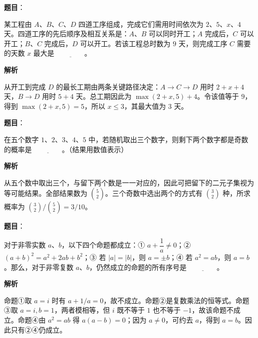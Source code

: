 \begin{answer}

\textbf{题目}：

某工程由 $A$、$B$、$C$、$D$ 四道工序组成，完成它们需用时间依次为 $2$、$5$、$x$、$4$ 天。四道工序的先后顺序及相互关系是：$A$、$B$ 可以同时开工；$A$ 完成后，$C$ 可以开工；$B$、$C$ 完成后，$D$ 可以开工。若该工程总时数为 $9$ 天，则完成工序 $C$ 需要的天数 $x$ 最大是 $\underline{\qquad\qquad}$。

\textbf{解析}

从开工到完成 $D$ 的最长工期由两条关键路径决定：$A\to C\to D$ 用时 $2+x+4$ 天，$B\to D$ 用时 $5+4$ 天。总工期因此为 $\max(2+x,5)+4$。令该值等于 $9$，得到 $\max(2+x,5)=5$，所以 $x\le3$，其最大值为 $3$ 天。


\end{answer}
\begin{answer}

\textbf{题目}：

在五个数字 $1$、$2$、$3$、$4$、$5$ 中，若随机取出三个数字，则剩下两个数字都是奇数的概率是 $\underline{\qquad\qquad}$。（结果用数值表示）

\textbf{解析}

从五个数中取出三个，与留下两个数是一一对应的，因此可把留下的二元子集视为等可能结果。全部结果数为 $\binom52$。三个奇数中选出两个的方式有 $\binom32$ 种，所求概率为 $\binom32/\binom52=3/10$。


\end{answer}
\begin{answer}

\textbf{题目}：

对于非零实数 $a$、$b$，以下四个命题都成立：① $a+\dfrac{1}{a}\ne0$；② $(a+b)^2=a^2+2ab+b^2$；③ 若 $|a|=|b|$，则 $a=\pm b$；④ 若 $a^2=ab$，则 $a=b$。那么，对于非零复数 $a$、$b$，仍然成立的命题的所有序号是 $\underline{\qquad\qquad}$。

\textbf{解析}

命题①取 $a=i$ 时有 $a+1/a=0$，故不成立。命题②是复数乘法的恒等式。命题③取 $a=i,b=1$，两者模相等，但 $i$ 既不等于 $1$ 也不等于 $-1$，故该命题不成立。命题④由 $a^2=ab$ 得 $a(a-b)=0$；因为 $a\ne0$，可约去 $a$，得到 $a=b$。因此只有②④仍成立。


\end{answer}
